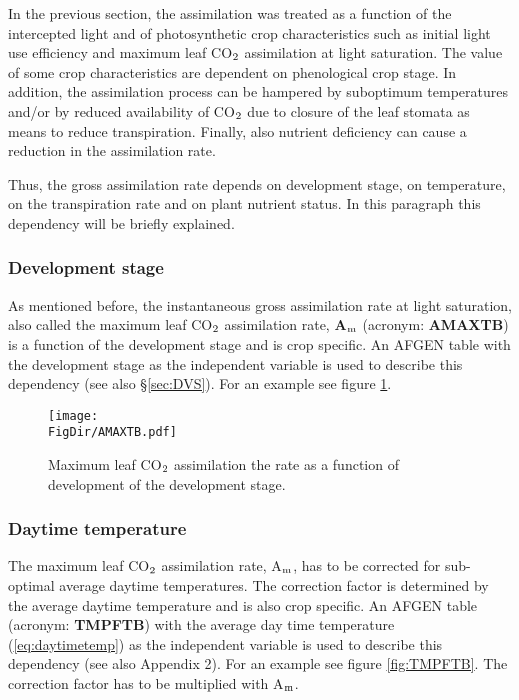 In the previous section, the assimilation was treated as a function of the intercepted light and of
photosynthetic crop characteristics such as initial light use efficiency and maximum leaf
CO$_{{\rm 2}}$ assimilation at light saturation. The value of some crop characteristics are dependent
on phenological crop stage. In addition, the assimilation process can be hampered by
suboptimum temperatures and/or by reduced availability of CO$_{{\rm 2}}$ due to closure of the leaf
stomata as means to reduce transpiration. Finally, also nutrient deficiency can cause a reduction
in the assimilation rate.

Thus, the gross assimilation rate depends on development stage, on temperature, on the transpiration rate
and on plant nutrient status. In this paragraph this dependency will be briefly explained.

\subsubsection{Development stage}
As mentioned before, the instantaneous gross assimilation rate at light saturation, also
called the maximum leaf CO$_{{\rm 2}}$ assimilation rate, {\bf A$_{{\rm m}}$} (acronym: 
{\bf AMAXTB}) is a function of
the development stage and is crop specific. An AFGEN table with the development stage
as the independent variable is used to describe this dependency (see also \S \ref{sec:DVS}). For an
example see figure \ref{fig:AMAXTB}.

\begin{figure}[p]
	\centering
	\texttt{[image: \\FigDir/AMAXTB.pdf]}
	\caption{Maximum leaf CO$_{{\rm 2}}$ assimilation the rate as a function of development of
		the development stage.}
	\label{fig:AMAXTB}
\end{figure}

\subsubsection{Daytime temperature}
The maximum leaf CO$_{{\rm 2}}$ assimilation rate, A$_{{\rm m}}$, has to be corrected for sub-optimal average
daytime temperatures. The correction factor is determined by the average daytime
temperature and is also crop specific. An AFGEN table (acronym: {\bf TMPFTB}) with the
average day time temperature (\ref{eq:daytimetemp}) as the independent variable is used to describe this
dependency (see also Appendix 2). For an example see figure \ref{fig:TMPFTB}. 
The correction factor has to be multiplied with A$_{{\rm m}}$. 

